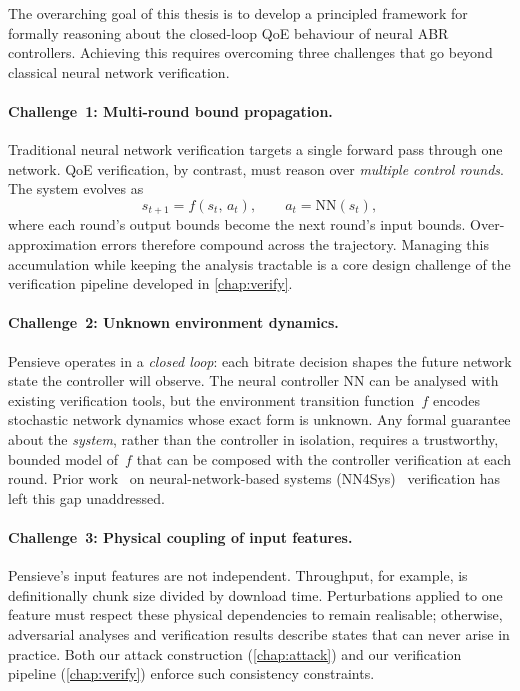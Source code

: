 \documentclass[thesis]{uofithesis} %
\begin{document}
    The overarching goal of this thesis is to develop a principled
    framework for formally reasoning about the closed-loop QoE behaviour
    of neural ABR controllers.  Achieving this requires overcoming
    three challenges that go beyond classical neural network
    verification.
 
    \paragraph{Challenge~1: Multi-round bound propagation.}
    Traditional neural network verification targets a single forward
    pass through one network.  QoE verification, by contrast, must
    reason over \emph{multiple control rounds}.  The system evolves as
    \begin{equation}
        s_{t+1} = f(s_t,\, a_t), \qquad a_t = \mathrm{NN}(s_t),
        \label{eq:closed-loop}
    \end{equation}
    where each round's output bounds become the next round's input
    bounds.  Over-approximation errors therefore compound across the
    trajectory.  Managing this accumulation while keeping the analysis
    tractable is a core design challenge of the verification pipeline
    developed in \ref{chap:verify}.

    \paragraph{Challenge~2: Unknown environment dynamics.}
    Pensieve operates in a \emph{closed loop}: each bitrate decision
    shapes the future network state the controller will observe.
    The neural controller $\mathrm{NN}$ can be analysed with existing
    verification tools, but the environment transition function~$f$
    encodes stochastic network dynamics whose exact form is unknown.
    Any formal guarantee about the \emph{system}, rather than the
    controller in isolation, requires a trustworthy, bounded model
    of~$f$ that can be composed with the controller verification at
    each round. Prior work~\cite{ouroboros, c3} on
    neural-network-based systems (NN4Sys)~\cite{congestion-control, pensieve}
    verification has left this gap unaddressed.

    \paragraph{Challenge~3: Physical coupling of input features.}
    Pensieve's input features are not independent.  Throughput, for
    example, is definitionally chunk size divided by download time.
    Perturbations applied to one feature must respect these physical
    dependencies to remain realisable; otherwise, adversarial analyses
    and verification results describe states that can never arise in
    practice.  Both our attack construction
    (\ref{chap:attack}) and our verification pipeline
    (\ref{chap:verify}) enforce such consistency constraints.
 
\end{document}
